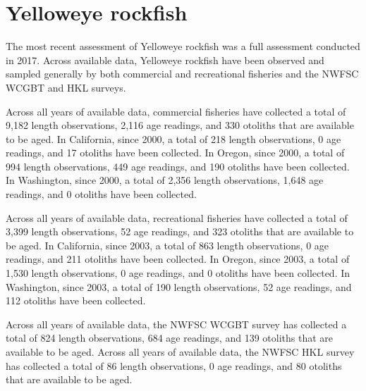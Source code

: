 \documentclass[11pt,
  english,
  letterpaper,
]{article}
\begin{document}

\hypertarget{yelloweye-rockfish}{%
\section{Yelloweye rockfish}\label{yelloweye-rockfish}}

\leavevmode\tagmcend\tagstructend


The most recent assessment of Yelloweye rockfish was a full assessment conducted in 2017. Across available data, Yelloweye rockfish have been observed and sampled generally by both commercial and recreational fisheries and the NWFSC WCGBT and HKL surveys.

\leavevmode\tagmcend\tagstructend\par


Across all years of available data, commercial fisheries have collected a total of 9,182 length observations, 2,116 age readings, and 330 otoliths that are available to be aged. In California, since 2000, a total of 218 length observations, 0 age readings, and 17 otoliths have been collected. In Oregon, since 2000, a total of 994 length observations, 449 age readings, and 190 otoliths have been collected. In Washington, since 2000, a total of 2,356 length observations, 1,648 age readings, and 0 otoliths have been collected.

\leavevmode\tagmcend\tagstructend\par


Across all years of available data, recreational fisheries have collected a total of 3,399 length observations, 52 age readings, and 323 otoliths that are available to be aged. In California, since 2003, a total of 863 length observations, 0 age readings, and 211 otoliths have been collected. In Oregon, since 2003, a total of 1,530 length observations, 0 age readings, and 0 otoliths have been collected. In Washington, since 2003, a total of 190 length observations, 52 age readings, and 112 otoliths have been collected.

\leavevmode\tagmcend\tagstructend\par


Across all years of available data, the NWFSC WCGBT survey has collected a total of 824 length observations, 684 age readings, and 139 otoliths that are available to be aged. Across all years of available data, the NWFSC HKL survey has collected a total of 86 length observations, 0 age readings, and 80 otoliths that are available to be aged.
\end{document}
